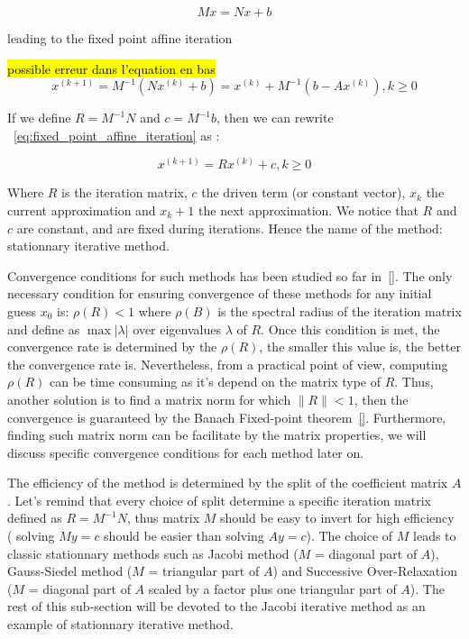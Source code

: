 \begin{equation}
    Mx = Nx + b
\end{equation}

leading to the fixed point affine iteration

\hl{possible erreur dans l'equation en bas}
\begin{equation}
    x^{(k+1)} = M^{-1}(N x^{(k)} + b) = x^{(k)} + M^{-1}(b - Ax^{(k)}) , k \geq 0
    \label{eq:fixed_point_affine_iteration}
\end{equation}

If we define $R = M^{-1}N$ and $c=M^{-1}b$, then we can rewrite ~\ref{eq:fixed_point_affine_iteration} as :

\begin{equation}
    x^{(k+1)} = Rx^{(k)} + c , k \geq 0
    \label{eq:fixed_point_affine_iteration_simple}
\end{equation}

Where $R$ is the iteration matrix, $c$ the driven term (or constant vector), $x_k$ the current approximation and $x_k+1$ the next approximation. We notice that $R$ and $c$ are constant, and are fixed during iterations. Hence the name of the method: stationnary iterative method.

Convergence conditions for such methods has been studied so far in~\ref{}. The only necessary condition for ensuring convergence of these methods for any initial guess $x_0$ is: $\rho(R) < 1$ where $\rho(B)$ is the spectral radius of the iteration matrix and define as  $\max |\lambda|$ over eigenvalues $\lambda$ of $R$. Once this condition is met, the convergence rate is determined by the $\rho(R)$, the smaller this value is, the better the convergence rate is. Nevertheless, from a practical point of view, computing $\rho(R)$ can be time consuming as it's depend on the matrix type of $R$. Thus, another solution is to find a matrix norm for which $\|R\| < 1$, then the convergence is guaranteed by the Banach Fixed-point theorem~\ref{}. Furthermore, finding such matrix norm can be facilitate by the matrix properties, we will discuss specific convergence conditions for each method later on.

The efficiency of the method is determined by the split of the coefficient matrix $A$. Let's remind that every choice of split determine a specific iteration matrix defined as  $R=M^{-1}N$, thus matrix $M$ should be easy to invert for high efficiency ( solving $My=c$ should be easier than solving $Ay=c$). The choice of $M$ leads to classic stationnary methods such as Jacobi method ($M$ = diagonal part of $A$), Gauss-Siedel method ($M$ = triangular part of $A$) and Successive Over-Relaxation ($M$ = diagonal part of $A$ scaled by a factor plus one triangular part of $A$). The rest of this sub-section will be devoted to the Jacobi iterative method as an example of stationnary iterative method.

